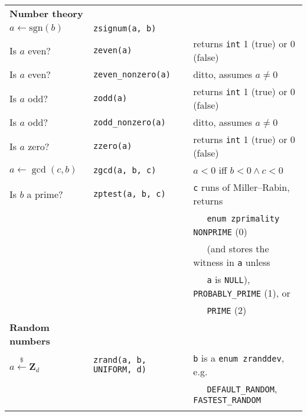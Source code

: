 \documentclass[10pt,draft]{article}
\begin{document}
\begin{tabular}{lll}
\textbf{Number theory}        & {}                         & {}                                                \\
$a \gets \mbox{sgn}(b)$       & {\tt zsignum(a, b)}        &                                                   \\
Is $a$ even?                  & {\tt zeven(a)}             & returns {\tt int} 1 (true) or 0 (false)           \\
Is $a$ even?                  & {\tt zeven\_nonzero(a)}    & ditto, assumes $a \neq 0$                         \\
Is $a$ odd?                   & {\tt zodd(a)}              & returns {\tt int} 1 (true) or 0 (false)           \\
Is $a$ odd?                   & {\tt zodd\_nonzero(a)}     & ditto, assumes $a \neq 0$                         \\
Is $a$ zero?                  & {\tt zzero(a)}             & returns {\tt int} 1 (true) or 0 (false)           \\
$a \gets \gcd(c, b)$          & {\tt zgcd(a, b, c)}        & $a < 0$ iff $b < 0 \wedge c < 0$                  \\
Is $b$ a prime?               & {\tt zptest(a, b, c)}      & {\tt c} runs of Miller--Rabin, returns            \\
{}                            & {}                         & $~~~~~$ {\tt enum zprimality} {\tt NONPRIME} (0)  \\
{}                            & {}                         & $~~~~~$ (and stores the witness in {\tt a} unless \\
{}                            & {}                         & $~~~~~$ {\tt a} is {\tt NULL}),
                                                                     {\tt PROBABLY\_PRIME} (1), or             \\
{}                            & {}                         & $~~~~~$ {\tt PRIME} (2)                           \\

\textbf{Random numbers}       & {}                         & {}                                                \\
$a \xleftarrow{\$} \textbf{Z}_d $ & {\tt zrand(a, b, UNIFORM, d)}
& {\tt b} is a {\tt enum zranddev}, e.g. \\
{}&{}& $~~~~~$ {\tt DEFAULT\_RANDOM}, {\tt FASTEST\_RANDOM} \\
\\


\end{tabular}
\end{document}

